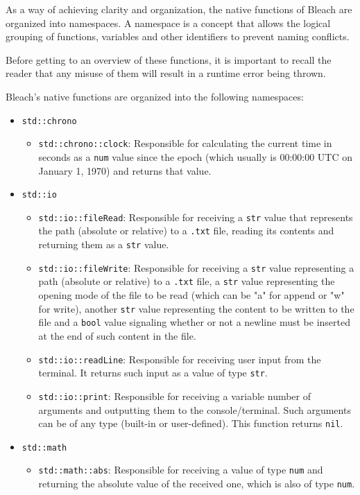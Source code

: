 As a way of achieving clarity and organization, the native functions of Bleach are organized into namespaces. A namespace is a concept that allows the logical grouping of functions, variables and other identifiers to prevent naming conflicts.

Before getting to an overview of these functions, it is important to recall the reader that any misuse of them will result in a runtime error being thrown.

Bleach's native functions are organized into the following namespaces:

\begin{itemize}
    \item \texttt{std::chrono}
        \begin{itemize}
            \item \texttt{std::chrono::clock}: Responsible for calculating the current time in seconds as a \texttt{num} value since the epoch (which usually is 00:00:00 UTC on January 1, 1970) and returns that value.
        \end{itemize}
    \item \texttt{std::io}
        \begin{itemize}
            \item \texttt{std::io::fileRead}: Responsible for receiving a \texttt{str} value that represents the path (absolute or relative) to a \texttt{.txt} file, reading its contents and returning them as a \texttt{str} value.
            
            \item \texttt{std::io::fileWrite}: Responsible for receiving a \texttt{str} value representing a path (absolute or relative) to a \texttt{.txt} file, a \texttt{str} value representing the opening mode of the file to be read (which can be "a" for append or "w" for write), another \texttt{str} value representing the content to be written to the file and a \texttt{bool} value signaling whether or not a newline must be inserted at the end of such content in the file.
            
            \item \texttt{std::io::readLine}: Responsible for receiving user input from the terminal. It returns such input as a value of type \texttt{str}.
            
            \item \texttt{std::io::print}: Responsible for receiving a variable number of arguments and outputting them to the console/terminal. Such arguments can be of any type (built-in or user-defined). This function returns \texttt{nil}.
        \end{itemize}
    \item \texttt{std::math}
        \begin{itemize}
            \item \texttt{std::math::abs}: Responsible for receiving a value of type \texttt{num} and returning the absolute value of the received one, which is also of type \texttt{num}.


\end{itemize}
\end{itemize}
